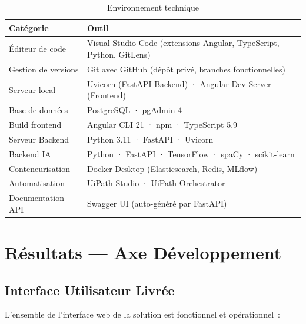 \documentclass[12pt,a4paper]{report}
\begin{document}
\begin{table}[H]
\centering
\caption{Environnement technique}
\begin{tabularx}{\textwidth}{|l|X|}
\hline
\textbf{Catégorie} & \textbf{Outil} \\
\hline
Éditeur de code & Visual Studio Code (extensions Angular, TypeScript, Python, GitLens) \\
\hline
Gestion de versions & Git avec GitHub (dépôt privé, branches fonctionnelles) \\
\hline
Serveur local & Uvicorn (FastAPI Backend) · Angular Dev Server (Frontend) \\
\hline
Base de données & PostgreSQL · pgAdmin 4 \\
\hline
Build frontend & Angular CLI 21 · npm · TypeScript 5.9 \\
\hline
Serveur Backend & Python 3.11 · FastAPI · Uvicorn \\
\hline
Backend IA & Python · FastAPI · TensorFlow · spaCy · scikit-learn \\
\hline
Conteneurisation & Docker Desktop (Elasticsearch, Redis, MLflow) \\
\hline
Automatisation & UiPath Studio · UiPath Orchestrator \\
\hline
Documentation API & Swagger UI (auto-généré par FastAPI) \\
\hline
\end{tabularx}
\end{table}


\chapter{Résultats --- Axe Développement}

\section{Interface Utilisateur Livrée}

L'ensemble de l'interface web de la solution est fonctionnel et opérationnel~:
\end{document}
